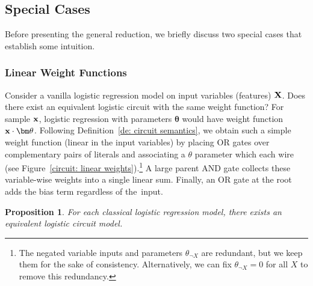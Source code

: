 \documentclass[letterpaper]{article} %
\newtheorem{proposition}[corollary]{Proposition}
\newcommand{\sample}{{\bf x}}
\begin{document}
\subsection{Special Cases}

Before presenting the general reduction, we briefly discuss two special cases that establish some intuition.

\subsubsection{Linear Weight Functions}
Consider a vanilla logistic regression model on input variables (features) $\bf X$.
Does there exist an equivalent logistic circuit with the same weight function?
For sample $\sample$, logistic regression with parameters ${\bm \theta}$ would have weight function $\sample \cdot {\bm \theta}$.
Following Definition~\ref{de: circuit semantics}, we obtain such a simple weight function (linear in the input variables) by placing OR gates over complementary pairs of literals and associating a $\theta$ parameter which each wire (see Figure~\ref{circuit: linear weights}).\footnote{The negated variable inputs and parameters $\theta_{\neg X}$ are redundant, but we keep them for the sake of consistency. Alternatively, we can fix $\theta_{\neg X} = 0$ for all $X$ to remove this redundancy.} A large parent AND gate collects these variable-wise weights into a single linear sum. Finally, an OR gate at the root adds the bias term regardless of the~input.
\begin{proposition}
For each classical logistic regression model, there exists an equivalent logistic circuit model.
\end{proposition}
\end{document}
